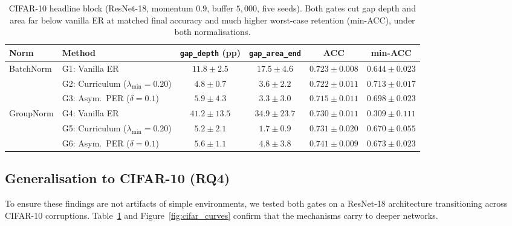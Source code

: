 \begin{table}[htbp]
    \centering
    \small
    \begin{tabular}{ll cccc}
        \hline
        Norm & Method                                   & \texttt{gap\_depth} (pp) & \texttt{gap\_area\_end} & ACC               & min-ACC           \\
        \hline
        \multirow{3}{*}{BatchNorm}
             & G1: Vanilla ER                           & $11.8 \pm 2.5$           & $17.5 \pm 4.6$          & $0.723 \pm 0.008$ & $0.644 \pm 0.023$ \\
             & G2: Curriculum ($\lambda_{\min}{=}0.20$) & $\mathbf{4.8 \pm 0.7}$   & $\mathbf{3.6 \pm 2.2}$  & $0.722 \pm 0.011$ & $0.713 \pm 0.017$ \\
             & G3: Asym.\ PER ($\delta{=}0.1$)          & $5.9 \pm 4.3$            & $3.3 \pm 3.0$           & $0.715 \pm 0.011$ & $0.698 \pm 0.023$ \\
        \hline
        \multirow{3}{*}{GroupNorm}
             & G4: Vanilla ER                           & $41.2 \pm 13.5$          & $34.9 \pm 23.7$         & $0.730 \pm 0.011$ & $0.309 \pm 0.111$ \\
             & G5: Curriculum ($\lambda_{\min}{=}0.20$) & $\mathbf{5.2 \pm 2.1}$   & $\mathbf{1.7 \pm 0.9}$  & $0.731 \pm 0.020$ & $0.670 \pm 0.055$ \\
             & G6: Asym.\ PER ($\delta{=}0.1$)          & $5.6 \pm 1.1$            & $4.8 \pm 3.8$           & $0.741 \pm 0.009$ & $0.673 \pm 0.023$ \\
        \hline
    \end{tabular}
    \caption{CIFAR-10 headline block (ResNet-18, momentum $0.9$, buffer $5{,}000$, five seeds). Both gates cut gap depth and area far below vanilla ER at matched final accuracy and much higher worst-case retention (min-ACC), under both normalisations.}
    \label{tab:res_cifar}
\end{table}

\subsection{Generalisation to CIFAR-10 (RQ4)}
\label{subsec:res_cifar}

To ensure these findings are not artifacts of simple environments, we tested both gates on a ResNet-18 architecture transitioning across CIFAR-10 corruptions. Table~\ref{tab:res_cifar} and Figure~\ref{fig:cifar_curves} confirm that the mechanisms carry to deeper networks.

